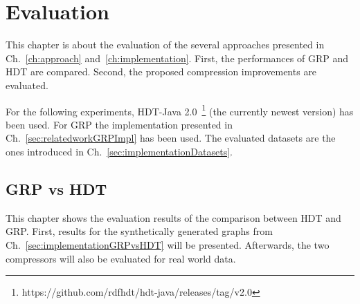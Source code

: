 \chapter{Evaluation}\label{ch:evaluation}

This chapter is about the evaluation of the several approaches presented in Ch.~\ref{ch:approach} and~\ref{ch:implementation}.  First, the performances of GRP and HDT are compared. Second, the proposed compression improvements are evaluated.

For the following experiments, HDT-Java 2.0~\footnote{\label{foot:1}https://github.com/rdfhdt/hdt-java/releases/tag/v2.0} (the currently newest version) has been used. For GRP the implementation presented in Ch.~\ref{sec:relatedworkGRPImpl} has been used. The evaluated datasets are the ones introduced in Ch.~\ref{sec:implementationDatasets}.


\section{GRP vs HDT}\label{sec:evaluationHDTvsGRP}

This chapter shows the evaluation results of the comparison between HDT and GRP. First, results for the synthetically generated graphs from Ch.~\ref{sec:implementationGRPvsHDT} will be presented. Afterwards, the two compressors will also be evaluated for real world data.

